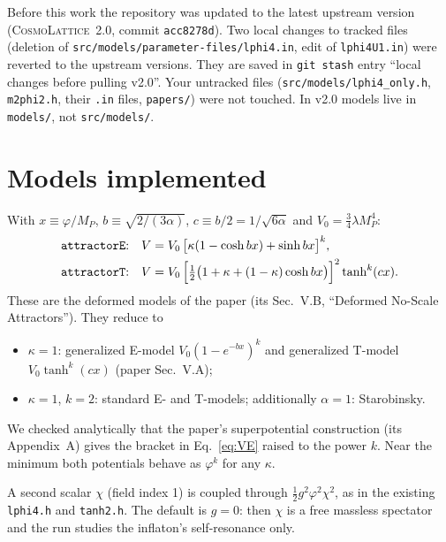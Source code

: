 \documentclass[11pt,a4paper]{article}
\newcommand{\MP}{M_P}
\newcommand{\aatt}{\alpha}
\newcommand{\file}[1]{\texttt{#1}}
\begin{document}
Before this work the repository was updated to the latest upstream version (\textsc{CosmoLattice}~2.0, commit \texttt{acc8278d}). Two local changes to tracked files (deletion of \file{src/models/}\allowbreak\file{parameter-files/lphi4.in}, edit of \file{lphi4U1.in}) were reverted to the upstream versions. They are saved in \texttt{git stash} entry ``local changes before pulling v2.0''. Your untracked files (\file{src/models/lphi4\_only.h}, \file{m2phi2.h}, their \file{.in} files, \file{papers/}) were not touched. In v2.0 models live in \file{models/}, not \file{src/models/}.

\section{Models implemented}
\label{sec:models}
With $x\equiv\varphi/\MP$, $b\equiv\sqrt{2/(3\aatt)}$, $c\equiv b/2=1/\sqrt{6\aatt}$ and $V_0=\tfrac34\lambda\MP^4$:
\begin{align}
\text{\file{attractorE}:}\quad V &= V_0\,\big[\kappa(1-\cosh bx)+\sinh bx\big]^k, \label{eq:VE}\\
\text{\file{attractorT}:}\quad V &= V_0\,\Big[\tfrac12\big(1+\kappa+(1-\kappa)\cosh bx\big)\Big]^2\tanh^k(cx). \label{eq:VT}
\end{align}
These are the deformed models of the paper (its Sec.~V.B, ``Deformed No-Scale Attractors''). They reduce to
\begin{itemize}
\item $\kappa=1$: generalized E-model $V_0(1-e^{-bx})^k$ and generalized T-model $V_0\tanh^k(cx)$ (paper Sec.~V.A);
\item $\kappa=1$, $k=2$: standard E- and T-models; additionally $\aatt=1$: Starobinsky.
\end{itemize}
We checked analytically that the paper's superpotential construction (its Appendix~A) gives the bracket in Eq.~\eqref{eq:VE} raised to the power $k$. Near the minimum both potentials behave as $\varphi^k$ for any $\kappa$.

A second scalar $\chi$ (field index 1) is coupled through $\tfrac12 g^2\varphi^2\chi^2$, as in the existing \file{lphi4.h} and \file{tanh2.h}. The default is $g=0$: then $\chi$ is a free massless spectator and the run studies the inflaton's self-resonance only.

\end{document}
